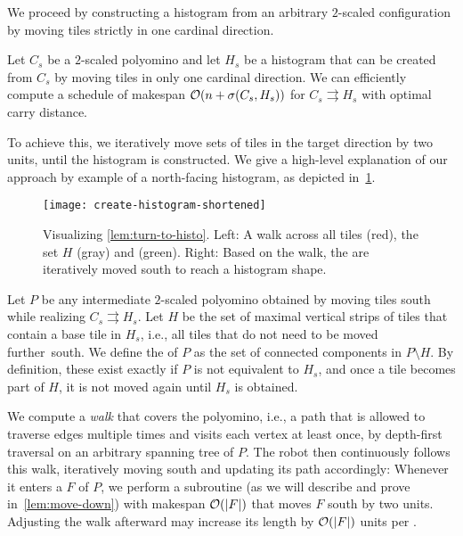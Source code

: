 We proceed by constructing a histogram from an arbitrary $2$-scaled configuration by moving tiles strictly in one cardinal direction.

\begin{lemma}
    \label{lem:turn-to-histo}
    Let $C_s$ be a $2$-scaled polyomino and let $H_s$ be a histogram that can be created from $C_s$ by moving tiles in only one cardinal direction.
    We can efficiently compute a schedule of makespan $\mathcal{O}(n + \sigma(C_s,H_s))$ for $C_s \rightrightarrows H_s$ with optimal carry distance.
\end{lemma}

To achieve this, we iteratively move sets of tiles in the target direction by two units, until the histogram is constructed.
We give a high-level explanation of our approach by example of a north-facing histogram, as depicted in~\cref{fig:move-down}.

\begin{figure}[htb]
    \centering%
    \texttt{[image: create-histogram-shortened]}%
    \caption{Visualizing \cref{lem:turn-to-histo}.
    Left: A walk across all tiles (red), the set $H$ (gray) and \comps{} (green).
    Right: Based on the walk, the \comps{} are iteratively moved south to reach a histogram shape.}
    \label{fig:move-down}
\end{figure}
Let $P$ be any intermediate $2$-scaled polyomino obtained by moving tiles south  while realizing ${C_s \rightrightarrows H_s}$.
Let $H$ be the set of maximal vertical strips of tiles that contain a base tile in $H_s$, i.e., all tiles that do not need to be moved further~south.
We define the \emph{\comps{}} of $P$ as the set of connected components in $P \setminus H$.
By definition, these exist exactly if $P$ is not equivalent to $H_s$, and once a tile becomes part of $H$, it is not moved again until $H_s$ is obtained.

We compute a \emph{walk} that covers the polyomino, i.e., a path that is allowed to traverse edges multiple times and visits each vertex at least once, by depth-first traversal on an arbitrary spanning tree of $P$.
The robot then continuously follows this walk, iteratively moving \comps south and updating its path accordingly:
Whenever it enters a \comp $F$ of $P$, we perform a subroutine (as we will describe and prove in~\cref{lem:move-down}) with makespan $\mathcal{O}(|F|)$ that moves $F$ south by two units.
Adjusting the walk afterward may increase its length by $\mathcal{O}(|F|)$ units per \mbox{\comp}.

